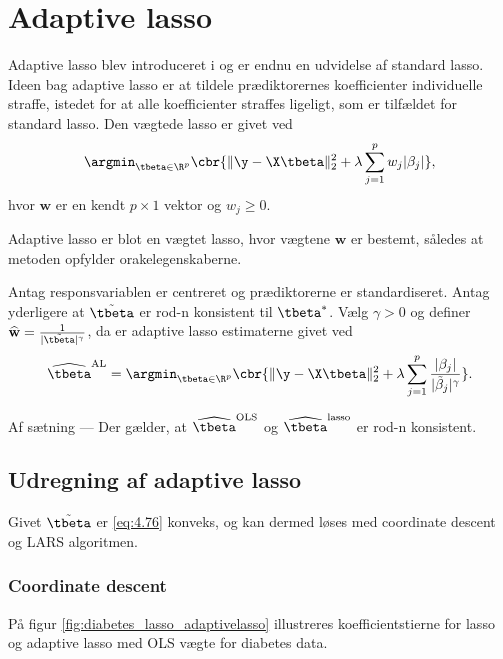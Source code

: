 \section{Adaptive lasso}
Adaptive lasso blev introduceret i \citep{adaptive_lasso} og er endnu en udvidelse af standard lasso.
Ideen bag adaptive lasso er at tildele prædiktorernes koefficienter individuelle straffe, istedet for at alle koefficienter straffes ligeligt, som er tilfældet for standard lasso.
Den vægtede lasso er givet ved
\begin{align*}
\argmin_{\tbeta \in \R^p} \cbr{\Vert \y - \X \tbeta \Vert_2^2 + \lambda \sum_{j=1}^p w_j \vert \beta_j \vert},
\end{align*}
hvor \(\mathbf{w}\) er en kendt \(p \times 1\) vektor og \(w_j \geq 0\).

Adaptive lasso er blot en vægtet lasso, hvor vægtene \(\mathbf{w}\) er bestemt, således at metoden opfylder orakelegenskaberne.
\begin{defn}
Antag responsvariablen er centreret og prædiktorerne er standardiseret.
Antag yderligere at \(\tilde{\tbeta}\) er rod-n konsistent til \(\tbeta^*\).
Vælg \(\gamma>0\) og definer \(\widehat{\mathbf{w}} = \frac{1}{\vert \tilde{\tbeta} \vert^\gamma}\), da er adaptive lasso estimaterne givet ved
\begin{align}
\widehat{\tbeta}^\text{AL} = \argmin_{\tbeta \in \R^p} \cbr{ \Vert \y - \X \tbeta \Vert_2^2 + \lambda \sum_{j=1}^p \frac{ \vert \beta_j \vert}{\vert \tilde{\beta}_j \vert^\gamma}}. \label{eq:4.76}
\end{align}
\end{defn}
Af sætning --- Der gælder, at \(\widehat{\tbeta}^\text{OLS}\) og \(\widehat{\tbeta}^\text{lasso}\) er rod-n konsistent.

\subsection{Udregning af adaptive lasso}
Givet \(\tilde{\tbeta}\) er \eqref{eq:4.76} konveks, og kan dermed løses med coordinate descent og LARS algoritmen.
\subsubsection{Coordinate descent}


På figur \ref{fig:diabetes_lasso_adaptivelasso} illustreres koefficientstierne for lasso og adaptive lasso med OLS vægte for diabetes data.

